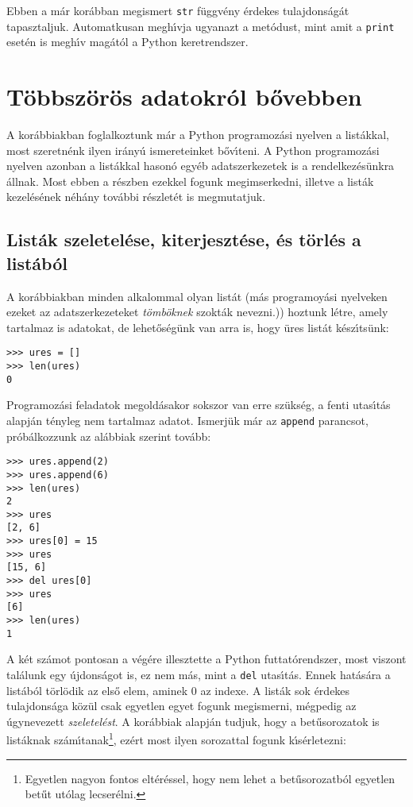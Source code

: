 Ebben a m\'ar kor\'abban megismert {\tt str} f\"uggv\'eny \'erdekes tulajdons\'ag\'at tapasztaljuk. Automatkusan 
megh\'{\i}vja ugyanazt a met\'odust, mint amit a {\tt print} eset\'en is megh\'{\i}v mag\'at\'ol a Python 
keretrendszer.

\section{T\"obbsz\"or\"os adatokr\'ol b\H{o}vebben}

A kor\'abbiakban foglalkoztunk m\'ar a Python programoz\'asi nyelven a list\'akkal, most szeretn\'enk ilyen 
ir\'any\'u ismereteinket b\H{o}v\'{\i}teni. A Python programoz\'asi nyelven azonban a list\'akkal hason\'o egy\'eb 
adatszerkezetek is a rendelkez\'es\"unkra \'allnak. Most ebben a r\'eszben ezekkel fogunk megimserkedni, illetve a 
list\'ak kezel\'es\'enek n\'eh\'any tov\'abbi r\'eszlet\'et is megmutatjuk.

\subsection{List\'ak szeletel\'ese, kiterjeszt\'ese, \'es t\"orl\'es a list\'ab\'ol}

A kor\'abbiakban minden alkalommal olyan list\'at (m\'as programoy\'asi nyelveken ezeket az adatszerkezeteket {\sl 
t\"omb\"oknek}  szokt\'ak nevezni.)) hoztunk l\'etre, amely tartalmaz is adatokat, de lehet\H{o}s\'eg\"unk 
van arra is, hogy \"ures list\'at k\'esz\'{\i}ts\"unk:

\begin{Verbatim}[fontsize=\small]
>>> ures = []
>>> len(ures)
0
\end{Verbatim}

\noindent Programoz\'asi feladatok megold\'asakor sokszor van erre sz\"uks\'eg, a fenti uta\-s\'{\i}\-t\'as alapj\'an 
t\'enyleg nem tartalmaz adatot. Ismerj\"uk m\'ar az {\tt append} parancsot, pr\'ob\'al\-koz\-zunk az al\'abbiak szerint tov\'abb:

\begin{Verbatim}[fontsize=\small]
>>> ures.append(2)
>>> ures.append(6)
>>> len(ures)
2
>>> ures
[2, 6]
>>> ures[0] = 15
>>> ures
[15, 6]
>>> del ures[0]
>>> ures
[6]
>>> len(ures)
1
\end{Verbatim}

A k\'et sz\'amot pontosan a v\'eg\'ere illesztette a Python futtat\'orendszer, most viszont tal\'alunk egy 
\'ujdons\'agot is, ez nem m\'as, mint a {\tt del} utas\'{\i}t\'as. Ennek hat\'as\'ara a list\'ab\'ol t\"orl\"odik 
az els\H{o} elem, aminek 0 az indexe. A list\'ak sok \'erdekes tulajdons\'aga k\"oz\"ul csak egyetlen egyet fogunk 
megismerni, m\'egpedig az \'ugynevezett {\sl szeletel\'est}. A kor\'abbiak alapj\'an tudjuk, hogy a bet\H{u}sorozatok 
is list\'aknak sz\'am\'{\i}tanak\footnote{Egyetlen nagyon fontos elt\'er\'essel, hogy nem lehet a bet\H{u}sorozatb\'ol 
egyetlen bet\H{u}t ut\'olag lecser\'elni.}, ez\'ert most ilyen sorozattal fogunk k\'{\i}s\'erletezni:

